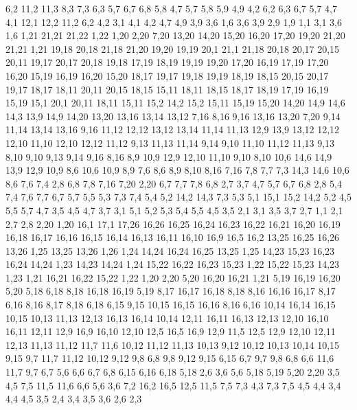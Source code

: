 %
6,2
11,2
11,3
8,3
7,3
6,3
%
5,7
6,7
6,8
5,8
%
4,7
5,7
5,8
5,9
4,9
%
4,2
6,2
6,3
6,7
5,7
4,7
%
4,1
12,1
12,2
11,2
6,2
4,2
%
3,1
4,1
4,2
4,7
4,9
3,9
3,6
%
1,6
3,6
3,9
2,9
1,9
%
1,1
3,1
3,6
1,6
1,21
21,21
21,22
1,22
%
1,20
2,20
7,20
13,20
14,20
15,20
16,20
17,20
19,20
21,20
21,21
1,21
%
19,18
20,18
21,18
21,20
19,20
19,19
%
20,1
21,1
21,18
20,18
20,17
20,15
20,11
%
19,17
20,17
20,18
19,18
%
17,19
18,19
19,19
19,20
17,20
%
16,19
17,19
17,20
16,20
%
15,19
16,19
16,20
15,20
%
18,17
19,17
19,18
19,19
18,19
%
18,15
20,15
20,17
19,17
18,17
%
18,11
20,11
20,15
18,15
%
15,11
18,11
18,15
18,17
18,19
17,19
16,19
15,19
%
15,1
20,1
20,11
18,11
15,11
15,2
%
14,2
15,2
15,11
15,19
15,20
14,20
14,9
14,6
14,3
%
13,9
14,9
14,20
13,20
13,16
13,14
13,12
%
7,16
8,16
9,16
13,16
13,20
7,20
%
9,14
11,14
13,14
13,16
9,16
%
11,12
12,12
13,12
13,14
11,14
11,13
%
12,9
13,9
13,12
12,12
12,10
%
11,10
12,10
12,12
11,12
%
9,13
11,13
11,14
9,14
%
9,10
11,10
11,12
11,13
9,13
%
8,10
9,10
9,13
9,14
9,16
8,16
%
8,9
10,9
12,9
12,10
11,10
9,10
8,10
%
10,6
14,6
14,9
13,9
12,9
10,9
%
8,6
10,6
10,9
8,9
%
7,6
8,6
8,9
8,10
8,16
7,16
7,8
7,7
%
7,3
14,3
14,6
10,6
8,6
7,6
7,4
%
2,8
6,8
7,8
7,16
7,20
2,20
%
6,7
7,7
7,8
6,8
%
2,7
3,7
4,7
5,7
6,7
6,8
2,8
%
5,4
7,4
7,6
7,7
6,7
5,7
5,5
%
5,3
7,3
7,4
5,4
%
5,2
14,2
14,3
7,3
5,3
%
5,1
15,1
15,2
14,2
5,2
%
4,5
5,5
5,7
4,7
%
3,5
4,5
4,7
3,7
%
3,1
5,1
5,2
5,3
5,4
5,5
4,5
3,5
%
2,1
3,1
3,5
3,7
2,7
%
1,1
2,1
2,7
2,8
2,20
1,20
16,1
17,1
17,26
16,26
16,25
16,24
16,23
16,22
16,21
16,20
16,19
16,18
16,17
16,16
16,15
16,14
16,13
16,11
16,10
16,9
16,5
16,2
%
13,25
16,25
16,26
13,26
%
1,25
13,25
13,26
1,26
%
1,24
14,24
16,24
16,25
13,25
1,25
%
14,23
15,23
16,23
16,24
14,24
%
1,23
14,23
14,24
1,24
%
15,22
16,22
16,23
15,23
%
1,22
15,22
15,23
14,23
1,23
%
1,21
16,21
16,22
15,22
1,22
%
1,20
2,20
5,20
16,20
16,21
1,21
%
5,19
16,19
16,20
5,20
%
5,18
6,18
8,18
16,18
16,19
5,19
%
8,17
16,17
16,18
8,18
%
8,16
16,16
16,17
8,17
%
6,16
8,16
8,17
8,18
6,18
%
6,15
9,15
10,15
16,15
16,16
8,16
6,16
%
10,14
16,14
16,15
10,15
%
10,13
11,13
12,13
16,13
16,14
10,14
%
12,11
16,11
16,13
12,13
%
12,10
16,10
16,11
12,11
%
12,9
16,9
16,10
12,10
%
12,5
16,5
16,9
12,9
%
11,5
12,5
12,9
12,10
12,11
12,13
11,13
11,12
11,7
11,6
%
10,12
11,12
11,13
10,13
%
9,12
10,12
10,13
10,14
10,15
9,15
%
9,7
11,7
11,12
10,12
9,12
9,8
%
6,8
9,8
9,12
9,15
6,15
%
6,7
9,7
9,8
6,8
%
6,6
11,6
11,7
9,7
6,7
%
5,6
6,6
6,7
6,8
6,15
6,16
6,18
5,18
%
2,6
3,6
5,6
5,18
5,19
5,20
2,20
%
3,5
4,5
7,5
11,5
11,6
6,6
5,6
3,6
%
7,2
16,2
16,5
12,5
11,5
7,5
7,3
%
4,3
7,3
7,5
4,5
4,4
%
3,4
4,4
4,5
3,5
%
2,4
3,4
3,5
3,6
2,6
%
2,3
